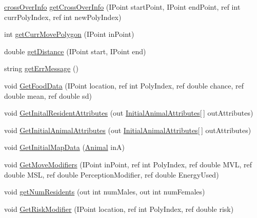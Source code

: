 \begin{DoxyCompactItemize}
\item 
\hyperlink{class_p_a_z___dispersal_1_1cross_over_info}{cross\-Over\-Info} \hyperlink{class_p_a_z___dispersal_1_1_map_manager_a36b64fe9c25cf153bd8eb44c37b4b942}{get\-Cross\-Over\-Info} (I\-Point start\-Point, I\-Point end\-Point, ref int curr\-Poly\-Index, ref int new\-Poly\-Index)
\item 
int \hyperlink{class_p_a_z___dispersal_1_1_map_manager_a53e0a9444d87b27d463cf20fa9d2cb79}{get\-Curr\-Move\-Polygon} (I\-Point in\-Point)
\item 
double \hyperlink{class_p_a_z___dispersal_1_1_map_manager_a705d85041d1af38fff4cadfdbfe80ffd}{get\-Distance} (I\-Point start, I\-Point end)
\item 
string \hyperlink{class_p_a_z___dispersal_1_1_map_manager_aecc5d4dd82658f9223d1f605330bb162}{get\-Err\-Message} ()
\item 
void \hyperlink{class_p_a_z___dispersal_1_1_map_manager_aef8b344c9fc11db2278cd55173bccd99}{Get\-Food\-Data} (I\-Point location, ref int Poly\-Index, ref double chance, ref double mean, ref double sd)
\item 
void \hyperlink{class_p_a_z___dispersal_1_1_map_manager_af4ae7927b9a8fac4c3e73e4cb279584c}{Get\-Inital\-Resident\-Attributes} (out \hyperlink{class_p_a_z___dispersal_1_1_initial_animal_attributes}{Initial\-Animal\-Attributes}\mbox{[}$\,$\mbox{]} out\-Attributes)
\item 
void \hyperlink{class_p_a_z___dispersal_1_1_map_manager_a85e980f29acef80d9d2d62d9d4586b86}{Get\-Initial\-Animal\-Attributes} (out \hyperlink{class_p_a_z___dispersal_1_1_initial_animal_attributes}{Initial\-Animal\-Attributes}\mbox{[}$\,$\mbox{]} out\-Attributes)
\item 
void \hyperlink{class_p_a_z___dispersal_1_1_map_manager_a69387ea3309f4d4105b55759ab444a89}{Get\-Initial\-Map\-Data} (\hyperlink{class_p_a_z___dispersal_1_1_animal}{Animal} in\-A)
\item 
void \hyperlink{class_p_a_z___dispersal_1_1_map_manager_a2d7dd0c555493440e2b112d91c5dfa91}{Get\-Move\-Modifiers} (I\-Point in\-Point, ref int Poly\-Index, ref double M\-V\-L, ref double M\-S\-L, ref double Perception\-Modifier, ref double Energy\-Used)
\item 
void \hyperlink{class_p_a_z___dispersal_1_1_map_manager_a06e9c2fa1af02d2145e36bc6c6e81dac}{get\-Num\-Residents} (out int num\-Males, out int num\-Females)
\item 
void \hyperlink{class_p_a_z___dispersal_1_1_map_manager_ae32a1df198fdf62600743f028f6e587f}{Get\-Risk\-Modifier} (I\-Point location, ref int Poly\-Index, ref double risk)

\end{DoxyCompactItemize}
